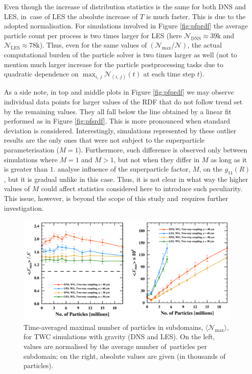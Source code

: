 \documentclass{pracamgren}
\begin{document}
Even though the increase of distribution statistics is the same for both DNS and LES, in~case of LES the absolute increase of $T$ is much faster.
This is due to the adopted normalisation.
For simulations involved in Figure \ref{fig:pfprdf} the average particle count per process is two times larger for LES (here $\mathcal{N}_{\text{DNS}} \approx 39\text{k}$ and $\mathcal{N}_{\text{LES}} \approx 78\text{k}$).
Thus, even for the same values of $(\mathcal{N}_{\max} / \mathcal{N})$, the actual computational burden of the particle solver is two times larger as well (not to mention much larger increase for the particle postprocessing tasks due to quadratic dependence on $\max_{i,\,j} \mathcal{N}_{(i,\,j)}(t)$ at each time step $t$).

As a side note, in top and middle plots in Figure \ref{fig:pfprdf} we may observe individual data points for larger values of the RDF that do not follow trend set by the remaining values.
They all fall below the line obtained by a linear fit performed as in Figure \ref{fig:pfsrdf}.
This is more pronounced when standard deviation is considered.
Interestingly, simulations represented by these outlier results are the only ones that were not subject to the superparticle parameterisation ($M=1$).
Furthermore, such difference is observed only between simulations where $M = 1$ and $M > 1$, but not when they differ in $M$ as long as it is greater than $1$.
\textcite{Rosa2022} analyse influence of the superparticle factor, $M$, on the $g_{11}(R)$, but it is gradual unlike in this case.
Thus, it is not clear in what way the higher values of $M$ could affect statistics considered here to introduce such peculiarity.
This issue, however, is beyond the scope of this study and~requires further investigation. 

\begin{figure}[h]
\centering
\includegraphics[width=13.5cm]{img/plots/3-4b-pfptwc.pdf}
\caption{
Time-averaged maximal number of particles in subdomains, $\langle \mathcal{N}_{\max} \rangle$, for TWC simulations with gravity (DNS and LES).
On the left, values are normalised by the average number of~particles per subdomain; on the right, absolute values are given (in thousands of particles).
}
\label{fig:pfptwc}
\end{figure}
\end{document}
